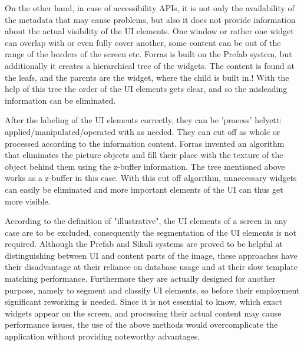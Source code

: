 \documentclass[draft,final]{vutinfth} %
\begin{document}
	On the other hand, in case of accessibility APIs, it is not only the availability of the metadata that may cause problems, but also it does not provide information about the actual visibility of the UI elements.
	One window or rather one widget can overlap with or even fully cover another, some content can be out of the range of the borders of the screen etc.    
	Forras is built on the Prefab system, but additionally it creates a hierarchical tree of the widgets. 
	The content is found at the leafs, and the parents are the widget, where the child is built in.!
	With the help of this tree the order of the UI elements gets clear, and so the misleading information can be eliminated.\par
	After the labeling of the UI elements correctly, they can be 'process' helyett: applied/manipulated/operated with as needed.
	They can cut off as whole or processed according to the information content.
	Forras invented an algorithm that eliminates the picture objects and fill their place with the texture of the object behind them using the z-buffer information.
	The tree mentioned above works as a z-buffer in this case.
	With this cut off algorithm, unnecessary widgets can easily be eliminated and more important elements of the UI can thus get more visible.\par
	According to the definition of "illustrative", the UI elements of a screen in any case are to be excluded, consequently the segmentation of the UI elements is not required.
	Although the Prefab and Sikuli systems are proved to be helpful at distinguishing between UI and content parts of the image, these approaches have their disadvantage at their reliance on database usage and at their slow template matching performance. 
	Furthermore they are actually designed for another purpose, namely to segment and classify UI elements, so before their employment significant reworking is needed.
	Since it is not essential to know, which exact widgets appear on the screen, and processing their actual content may cause performance issues, the use of the above methods would overcomplicate the application without providing noteworthy advantages.
	
\end{document}
